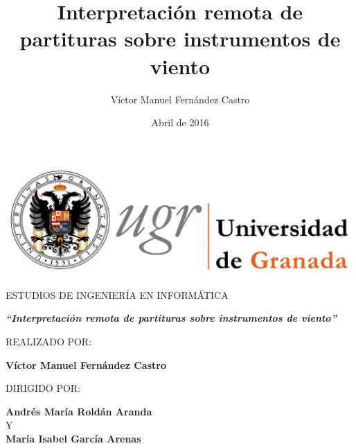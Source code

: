 \documentclass[10pt,a4paper]{article}
\title{Interpretación remota de partituras sobre instrumentos de viento}
\author{Víctor Manuel Fernández Castro}
\date{Abril de 2016}
\begin{document}
	
	
	\thispagestyle{empty}
	
	\begin{center}
		\includegraphics[scale=0.2]{images/logo_ugr}
	\par\end{center}
	
	\begin{center}
		ESTUDIOS DE INGENIERÍA EN INFORMÁTICA
	\end{center}
	
	\begin{center}
		\vspace*{1cm}
	\end{center}
	
	\begin{center}
		\textbf{\emph{\Large {}``Interpretación remota de partituras sobre instrumentos de viento''}}
	\end{center}
	
	\begin{center}
		\vspace*{0.5cm}
	\end{center}
	
	\begin{center}
		REALIZADO POR:
	\end{center}
	
	\begin{center}
		\textbf{Víctor Manuel Fernández Castro}
	\end{center}
	
	\begin{center}
		\vspace*{0.5cm}
	\end{center}
	
	\begin{center}
		DIRIGIDO POR:
	\end{center}
	
	\begin{center}
		\textbf{Andrés María Roldán Aranda} \\
		Y \\
		\textbf{María Isabel García Arenas}
	\end{center}
	
\end{document}
